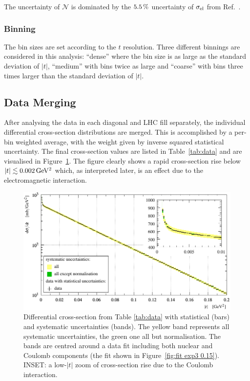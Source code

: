 The uncertainty of $\mathcal{N}$ is dominated by the $5.5\,{\rm \%}$ uncertainty of $\sigma_{\rm el}$ from Ref.~\cite{totem-13tev-90m}.



\subsubsection{Binning}
\label{sec:binning}

The bin sizes are set according to the $t$ resolution. Three different binnings are considered in this analysis: ``dense'' where the bin size is as large as the standard deviation of $|t|$, ``medium'' with bins twice as large and ``coarse'' with bins three times larger than the standard deviation of $|t|$.




\subsection{Data Merging}
\label{sec:data merging}

After analysing the data in each diagonal and LHC fill separately, the individual differential cross-section distributions are merged. This is accomplished by a per-bin weighted average, with the weight given by inverse squared statistical uncertainty. The final cross-section values are listed in Table~\ref{tab:data} and are visualised in Figure~\ref{fig:dsdt}. The figure clearly shows a rapid cross-section rise below $|t| \lesssim 0.002\,{\rm GeV^2}$ which, as interpreted later, is an effect due to the electromagnetic interaction.

\begin{figure}
\vskip-5mm
\begin{center}
\includegraphics{fig/t_dist_merged_with_unc.pdf}
\caption{%
Differential cross-section from Table \ref{tab:data} with statistical (bars) and systematic uncertainties (bands). The yellow band represents all systematic uncertainties, the green one all but normalisation. The bands are centred around a data fit including both nuclear and Coulomb components (the fit shown in Figure~\ref{fig:fit exp3 0.15}). INSET: a low-$|t|$ zoom of cross-section rise due to the Coulomb interaction.
}
\label{fig:dsdt}
\end{center}
\end{figure}



